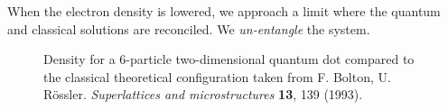 \documentclass[
paper=128mm:96mm, %
fontsize=11pt, %
pagesize, %
parskip=half-, %
]{scrartcl} %
\theoremstyle{mythmstyle} %
\begin{document}

When the electron density is lowered, we approach a limit where the quantum and classical solutions are reconciled. We \textit{un-entangle} the system.

\clearpage


 \begin{figure}
 \begin{center}
  \label{fig:wigner20}
  \caption{Density for a 6-particle two-dimensional quantum dot compared to the classical theoretical configuration taken from F. Bolton, U. R\"{o}ssler.  \textit{Superlattices and microstructures} \textbf{13}, 139 (1993).}
 \end{center}
\end{figure}
\end{document}
